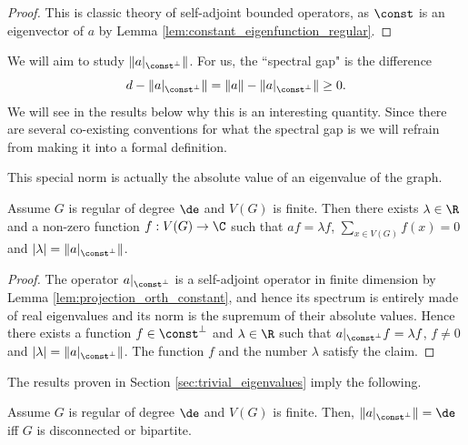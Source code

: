 \begin{proof}
  This is classic theory of self-adjoint bounded operators, as $\const$ is an
  eigenvector of $a$ by Lemma \ref{lem:constant_eigenfunction_regular}.
\end{proof}

We will aim to study $\|a|_{\const^\perp}\|$.
For us, the ``spectral gap" is the difference
$$d - \|a|_{\const^\perp}\| = \|a\| - \|a|_{\const^\perp}\| \geq 0.$$
We will see in the results below why this is an interesting quantity.
Since there are several co-existing conventions for what the spectral gap is
we will refrain from making it into a formal definition.

This special norm is actually the absolute value of an eigenvalue of the graph.

\begin{lemma}
  \label{lem:norm_perp_is_eig}
  Assume $G$ is regular of degree $\de$ and $V(G)$ is finite.
  Then there exists $\lambda \in \R$ and a non-zero
  function $f : V(G) \rightarrow \C$
  such that $af=\lambda f$, $\sum_{x \in V(G)}f(x)=0$
   and $|\lambda| = \|a|_{\const^\perp}\|$.
\end{lemma}

\begin{proof}
  The operator $a|_{\const^\perp}$ is a self-adjoint operator in finite dimension
  by Lemma \ref{lem:projection_orth_constant}, and hence its spectrum is entirely
  made of real eigenvalues and its norm is the supremum of their absolute values.
  Hence there exists a function $f \in \const^\perp$ and $\lambda \in \R$
  such that $a|_{\const^\perp}f = \lambda f$, $f \neq 0$ and $|\lambda|=\|a|_{\const^\perp}\|$.
  The function $f$ and the number $\lambda$ satisfy the claim.
\end{proof}

The results proven in Section \ref{sec:trivial_eigenvalues} imply the following.

\begin{proposition}
  \label{prop:gap_iff}
  Assume $G$ is regular of degree $\de$ and $V(G)$ is finite.
  Then, $\|a|_{\const^\perp}\| = \de$ iff $G$ is disconnected or bipartite.
\end{proposition}


